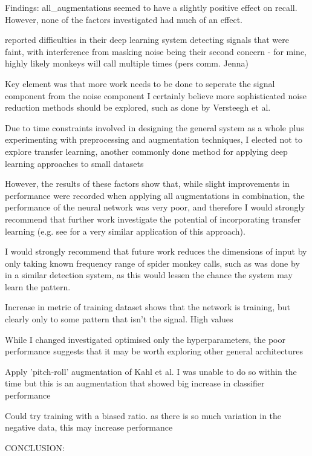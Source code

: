 \documentclass[11pt]{article}
\begin{document}
Findings: all_augmentations seemed to have a slightly positive effect on recall.
However, none of the factors investigated had much of an effect.

\citep{stowell2018automatic} reported difficulties in their deep learning system detecting signals that were faint, with interference from masking noise being their second concern
- for mine, highly likely monkeys will call multiple times (pers comm. Jenna) 

Key element was that more work needs to be done to seperate the signal component from the noise component
I certainly believe more sophisticated noise reduction methods should be explored, such as done by Versteegh et al. 

Due to time constraints involved in designing the general system as a whole plus experimenting with preprocessing and augmentation techniques, I elected not to explore transfer learning, another commonly done method for applying deep learning approaches to small datasets
 
However, the results of these factors show that, while slight improvements in performance were recorded when applying all augmentations in combination, the performance of the neural network was very poor, and therefore I would strongly recommend that further work investigate the potential of incorporating transfer learning (e.g. see \cite{strout2017anuran} for a very similar application of this approach).

I would strongly recommend that future work reduces the dimensions of input by only taking known frequency range of spider monkey calls, such as was done by \cite{mac2018bat} in a similar detection system, as this would lessen the chance the system may learn the pattern.

Increase in metric of training dataset shows that the network is training, but clearly only to some pattern that isn't the signal.
High values 

While I changed investigated optimised only the hyperparameters, the poor performance suggests that it may be worth exploring other general architectures

Apply 'pitch-roll' augmentation of Kahl et al. I was unable to do so within the time but this is an augmentation that showed big increase in classifier performance 

Could try training with a biased ratio. as there is so much variation in the negative data, this may increase performance  

CONCLUSION:
\end{document}
